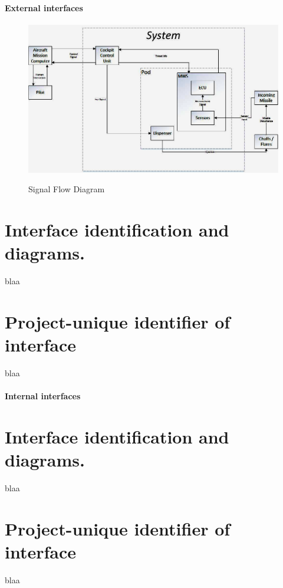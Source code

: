 \subsubsection{External interfaces}
\begin{figure}[h]
	\centering
	\includegraphics[scale=0.5]{./images/SignalFlowDiagram}\\
	\caption{Signal Flow Diagram}
    \label{fig:sigFlowDiagram}
\end{figure}
\chapter{Interface identification and diagrams.}
blaa
\chapter{Project-unique identifier of interface}
blaa
\subsubsection{Internal interfaces}
\chapter{Interface identification and diagrams.}
blaa
\chapter{Project-unique identifier of interface}
blaa